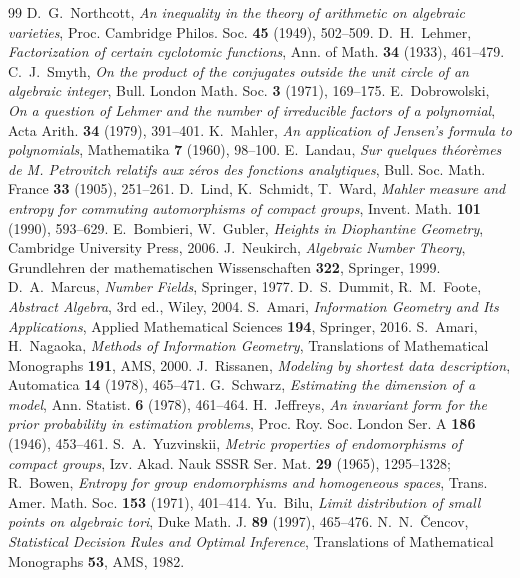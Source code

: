 \documentclass[11pt]{article}
\theoremstyle{plain}
\theoremstyle{definition}
\theoremstyle{remark}
\begin{document}
\begin{thebibliography}{99}
 D.~G.~Northcott, \emph{An inequality in the theory of arithmetic on algebraic
  varieties}, Proc. Cambridge Philos. Soc. \textbf{45} (1949), 502--509.
 D.~H.~Lehmer, \emph{Factorization of certain cyclotomic functions}, Ann. of Math.
  \textbf{34} (1933), 461--479.
 C.~J.~Smyth, \emph{On the product of the conjugates outside the unit circle of an algebraic
  integer}, Bull. London Math. Soc. \textbf{3} (1971), 169--175.
 E.~Dobrowolski, \emph{On a question of Lehmer and the number of irreducible factors of
  a polynomial}, Acta Arith. \textbf{34} (1979), 391--401.
 K.~Mahler, \emph{An application of Jensen's formula to polynomials}, Mathematika
  \textbf{7} (1960), 98--100.
 E.~Landau, \emph{Sur quelques th\'eor\`emes de M. Petrovitch relatifs aux z\'eros des
  fonctions analytiques}, Bull. Soc. Math. France \textbf{33} (1905), 251--261.
 D.~Lind, K.~Schmidt, T.~Ward, \emph{Mahler measure and entropy for commuting automorphisms of
  compact groups}, Invent. Math. \textbf{101} (1990), 593--629.
 E.~Bombieri, W.~Gubler, \emph{Heights in Diophantine Geometry}, Cambridge
  University Press, 2006.
 J.~Neukirch, \emph{Algebraic Number Theory}, Grundlehren der mathematischen
  Wissenschaften \textbf{322}, Springer, 1999.
 D.~A.~Marcus, \emph{Number Fields}, Springer, 1977.
 D.~S.~Dummit, R.~M.~Foote, \emph{Abstract Algebra}, 3rd ed., Wiley, 2004.
 S.~Amari, \emph{Information Geometry and Its Applications}, Applied Mathematical Sciences
  \textbf{194}, Springer, 2016.
 S.~Amari, H.~Nagaoka, \emph{Methods of Information Geometry}, Translations of
  Mathematical Monographs \textbf{191}, AMS, 2000.
 J.~Rissanen, \emph{Modeling by shortest data description}, Automatica \textbf{14}
  (1978), 465--471.
 G.~Schwarz, \emph{Estimating the dimension of a model}, Ann. Statist. \textbf{6} (1978),
  461--464.
 H.~Jeffreys, \emph{An invariant form for the prior probability in estimation problems},
  Proc. Roy. Soc. London Ser. A \textbf{186} (1946), 453--461.
 S.~A.~Yuzvinskii, \emph{Metric properties of endomorphisms of compact groups}, Izv.
  Akad. Nauk SSSR Ser. Mat. \textbf{29} (1965), 1295--1328; R.~Bowen, \emph{Entropy for group endomorphisms
  and homogeneous spaces}, Trans. Amer. Math. Soc. \textbf{153} (1971), 401--414.
 Yu.~Bilu, \emph{Limit distribution of small points on algebraic tori}, Duke Math. J.
  \textbf{89} (1997), 465--476.
 N.~N.~\v{C}encov, \emph{Statistical Decision Rules and Optimal Inference}, Translations of
  Mathematical Monographs \textbf{53}, AMS, 1982.
\end{thebibliography}
\end{document}
